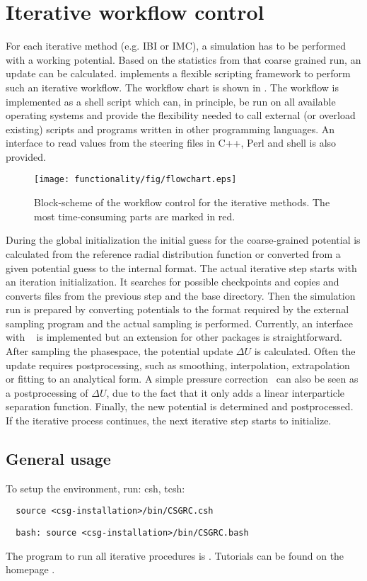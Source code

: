 \section{Iterative workflow control}
\label{sec:impl:scripting}
For each iterative method (e.g. IBI or IMC), a simulation has to be performed with a working potential. Based on the statistics from that coarse grained run, an update can be calculated. \votca implements a flexible scripting framework to perform such an iterative workflow. The workflow chart is shown in . The workflow is implemented as a shell script which can, in principle, be run on all available operating systems and provide the flexibility needed to call external (or overload existing) scripts and programs written in other programming languages. An interface to read values from the steering \xml files in C++, Perl and shell is also provided.

\begin{figure}
  \texttt{[image: functionality/fig/flowchart.eps]}
  \caption{
    \label{fig:flowchart}
    Block-scheme of the workflow control for the iterative methods. The most time-consuming parts are marked in red.
  }
\end{figure}

During the global initialization the initial guess for the coarse-grained potential is calculated from the reference radial distribution function or converted from a given potential guess to the internal format. The actual iterative step starts with an iteration initialization. It searches for possible checkpoints and copies and converts files from the previous step and the base directory. Then the simulation run is prepared by converting potentials to the format required by the external sampling program and the actual sampling is performed. Currently, an interface with \gromacs~\cite{gromacs4} is implemented but an extension for other packages is straightforward. After sampling the phasespace, the potential update $\Delta U$ is calculated. Often the update requires postprocessing, such as smoothing, interpolation, extrapolation or fitting to an analytical form. A simple pressure correction~\cite{Reith:2003} can also be seen as a postprocessing of $\Delta U$, due to the fact that it only adds a linear interparticle separation function.
%
Finally, the new potential is determined and postprocessed. If the iterative process continues, the next iterative step starts to initialize.

\subsection{General usage}
To setup the environment, run:
csh, tcsh:
\begin{verbatim}
  source <csg-installation>/bin/CSGRC.csh
\end{verbatim}
\begin{verbatim}
  bash: source <csg-installation>/bin/CSGRC.bash
\end{verbatim}
The program to run all iterative procedures is . Tutorials can be found on the \votca homepage \votcaweb. 

